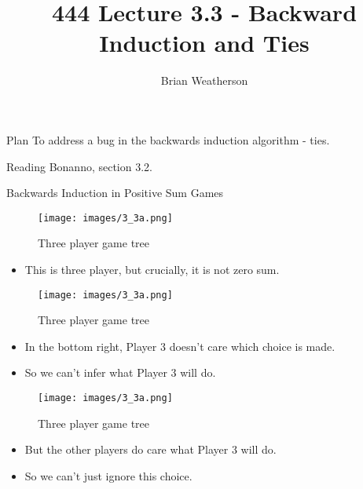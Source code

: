 \documentclass[
  ignorenonframetext,
]{beamer}
\title{444 Lecture 3.3 - Backward Induction and Ties}
\author{Brian Weatherson}
\date{}
\providecommand{\tightlist}{%
  \setlength{\itemsep}{0pt}\setlength{\parskip}{0pt}}
\begin{document}
\frame{\titlepage}

\begin{frame}{Plan}
\protect\hypertarget{plan}{}
To address a bug in the backwards induction algorithm - ties.
\end{frame}

\begin{frame}{Reading}
\protect\hypertarget{reading}{}
Bonanno, section 3.2.
\end{frame}

\begin{frame}{Backwards Induction in Positive Sum Games}
\protect\hypertarget{backwards-induction-in-positive-sum-games}{}
\begin{figure}
\centering
\texttt{[image: images/3\_3a.png]}
\caption{Three player game tree}
\end{figure}

\begin{itemize}
\tightlist
\item
  This is three player, but crucially, it is not zero sum.
\end{itemize}
\end{frame}

\begin{frame}
\begin{figure}
\centering
\texttt{[image: images/3\_3a.png]}
\caption{Three player game tree}
\end{figure}

\begin{itemize}[<+->]
\tightlist
\item
  In the bottom right, Player 3 doesn't care which choice is made.
\item
  So we can't infer what Player 3 will do.
\end{itemize}
\end{frame}

\begin{frame}
\begin{figure}
\centering
\texttt{[image: images/3\_3a.png]}
\caption{Three player game tree}
\end{figure}

\begin{itemize}[<+->]
\tightlist
\item
  But the other players do care what Player 3 will do.
\item
  So we can't just ignore this choice.
\end{itemize}
\end{frame}
\end{document}
